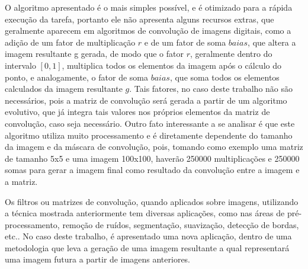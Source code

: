 O algoritmo apresentado é o mais simples possível, e é otimizado para a rápida execução da tarefa, portanto ele não apresenta alguns recursos extras, que geralmente aparecem em algoritmos de convolução de imagens digitais, como a adição de um fator de multiplicação \(r\) e de um fator de soma \(baias\), que altera a imagem resultante g gerada, de modo que o fator \(r\), geralmente dentro do intervalo \([0,1]\), multiplica todos os elementos da imagem após o cálculo do ponto, e analogamente, o fator de soma \(baias\), que soma todos os elementos calculados da imagem resultante \(g\).  Tais fatores, no caso deste trabalho não são necessários, pois a matriz de convolução será gerada a partir de um algoritmo evolutivo, que já integra tais valores nos próprios elementos da matriz de convolução, caso seja necessário. Outro fato interessante a se analisar é que este algoritmo utiliza muito processamento e é diretamente dependente do tamanho da imagem e da máscara de convolução, pois, tomando como exemplo uma matriz de tamanho 5x5 e uma imagem 100x100, haverão 250000 multiplicações e 250000 somas para gerar a imagem final como resultado da convolução entre a imagem e a matriz.

Os filtros ou matrizes de convolução, quando aplicados sobre imagens, utilizando a técnica mostrada anteriormente tem diversas aplicações, como nas áreas de pré-processamento, remoção de ruídos, segmentação, suavização, detecção de bordas, etc.. No caso deste trabalho, é apresentado uma nova aplicação, dentro de uma metodologia que leva a geração de uma imagem resultante a qual representará uma imagem futura a partir de imagens anteriores.